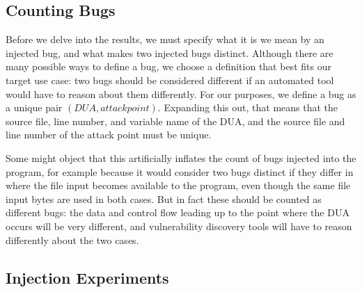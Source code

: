\subsection*{Counting Bugs}

Before we delve into the results, we must specify what it is we mean by an injected bug, and what makes two injected bugs distinct. Although there are many possible ways to define a bug, we choose a definition that best fits our target use case: two bugs should be considered different if an automated tool would have to reason about them differently. For our purposes, we define a bug as a unique pair $(DUA, attack point)$. Expanding this out, that means that the source file, line number, and variable name of the DUA, and the source file and line number of the attack point must be unique.

Some might object that this artificially inflates the count of bugs injected into the program, for example because it would consider two bugs distinct if they differ in where the file input becomes available to the program, even though the same file input bytes are used in both cases. 
But in fact these should be counted as different bugs: the data and control flow leading up to the point where the DUA occurs will be very different, and vulnerability discovery tools will have to reason differently about the two cases.

\subsection{Injection Experiments}
\label{sec:results:subsec:injection}

